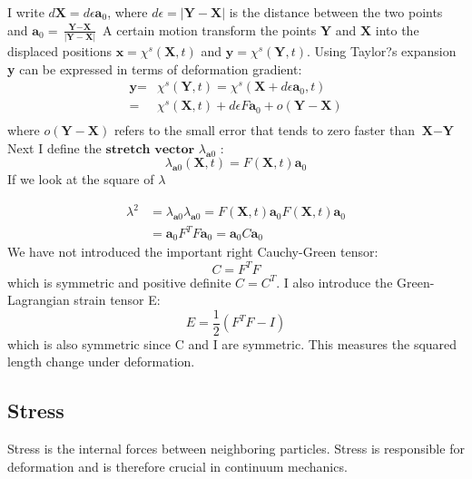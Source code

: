 I write $d\textbf{X} = d\epsilon \textbf{a}_0$,
where $d\epsilon = |\textbf{Y} - \textbf{X}|$ is the distance between the two points and $\textbf{a}_0 = \frac{\textbf{Y} - \textbf{X}}{|\textbf{Y} - \textbf{X}|}$
A certain motion transform the points $\textbf{Y}$ and $\textbf{X}$ into the displaced positions $\textbf{x} = \chi^s(\textbf{X},t)$ and $\textbf{y} = \chi^s(\textbf{Y},t)$. Using Taylor?s expansion \textbf{y} can be expressed in terms of deformation gradient:
\begin{align}
\textbf{y} =& \chi^s(\textbf{Y},t) = \chi^s(\textbf{X} + d\epsilon \textbf{a}_0,t) \\
=& \chi^s(\textbf{X},t) + d\epsilon F \textbf{a}_0 + o(\textbf{Y}-\textbf{X}) \\
\end{align}
where $o(\textbf{Y}-\textbf{X})$ refers to the small error that tends to zero faster than $\textbf{X} - \textbf{Y}$
Next I define the $\textbf{stretch vector}$ $\lambda_{\textbf{a}0}$ : 
\begin{equation}
\lambda_{\textbf{a}0}(\textbf{X},t) = F(\textbf{X},t)\textbf{a}_0 
\end{equation}
If we look at the square of $\lambda$

\begin{align}
\lambda^2 &=  \lambda_{\textbf{a}0} \lambda_{\textbf{a}0} = F(\textbf{X},t)\textbf{a}_0 F(\textbf{X},t)\textbf{a}_0 \\
&= \textbf{a}_0 F^TF\textbf{a}_0 = \textbf{a}_0 C \textbf{a}_0
\end{align}
We have not introduced the important right Cauchy-Green tensor:
 \begin{equation}
 C = F^TF
\end{equation}
which is symmetric and positive definite $C = C^T$.  I also introduce the Green-Lagrangian strain tensor E:
\begin{equation}\label{eq:StrainTensor}
E = \frac{1}{2}(F^TF -I) 
\end{equation}
which is also symmetric since C and I are symmetric. This measures the squared length change under deformation.
		
\subsection{Stress}
Stress is the internal forces between neighboring particles. Stress is responsible for deformation and is therefore crucial in continuum mechanics. 

